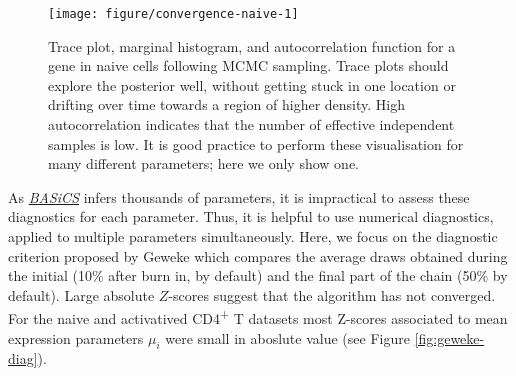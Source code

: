 \documentclass[9pt,a4paper,]{extarticle}
\begin{document}
\begin{figure}

{\centering \texttt{[image: figure/convergence-naive-1]} 

}

\caption{Trace plot, marginal histogram, and autocorrelation function for a gene in naive cells following MCMC sampling. Trace plots should explore the posterior well, without getting stuck in one location or drifting over time towards a region of higher density. High autocorrelation indicates that the number of effective independent samples is low. It is good practice to perform these visualisation for many different parameters; here we only show one.}\label{fig:convergence-naive}
\end{figure}

As \emph{\href{https://bioconductor.org/packages/3.11/BASiCS}{BASiCS}} infers thousands of parameters, it is
impractical to assess these diagnostics for each parameter.
Thus, it is helpful to use numerical diagnostics, applied to multiple
parameters simultaneously.
Here, we focus on the diagnostic criterion proposed by Geweke \citep{Geweke1995}
which compares the average draws obtained during the initial (10\% after burn
in, by default) and the final part of the chain (50\% by default).
Large absolute \(Z\)-scores suggest that the algorithm has not converged.
For the naive and activatived CD4\textsuperscript{+} T datasets most Z-scores associated to mean
expression parameters \(\mu_i\) were small in aboslute value (see
Figure \ref{fig:geweke-diag}).
\end{document}
